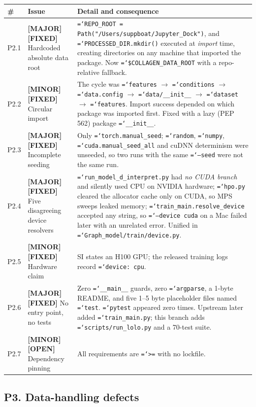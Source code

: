 \documentclass[11pt,a4paper]{article}
\newcommand{\ok}[1]{\textcolor{okgreen}{#1}}
\newcommand{\bad}[1]{\textcolor{badred}{#1}}
\newcommand{\warn}[1]{\textcolor{warnamber}{#1}}
\newcommand{\code}[1]{\texttt{\small\hyphenchar\font=`\-\relax #1}}
\newcommand{\SMAJOR}{\warn{\textbf{[MAJOR]}}}
\newcommand{\SMINOR}{\textbf{[MINOR]}}
\newcommand{\SFIXED}{\ok{\textbf{[FIXED]}}}
\newcommand{\SOPEN}{\bad{\textbf{[OPEN]}}}
\begin{document}
\begin{longtable}{@{}L{0.6cm}L{5.2cm}L{8.6cm}@{}}
\toprule
\textbf{\#} & \textbf{Issue} & \textbf{Detail and consequence} \\
\midrule
\endhead
P2.1 & \SMAJOR{} \SFIXED{} Hardcoded absolute data root &
  \code{REPO\_ROOT = Path("/Users/suppboat/Jupyter\_Dock")}, and
  \code{PROCESSED\_DIR.mkdir()} executed at \emph{import} time, creating
  directories on any machine that imported the package. Now
  \code{\$COLLAGEN\_DATA\_ROOT} with a repo-relative fallback. \\
P2.2 & \SMINOR{} \SFIXED{} Circular import &
  The cycle was \code{features} $\to$ \code{conditions} $\to$
  \code{data.config} $\to$ \code{data/\_\_init\_\_} $\to$ \code{dataset}
  $\to$ \code{features}. Import success depended on which package was
  imported first. Fixed with a
  lazy (PEP 562) package \code{\_\_init\_\_}. \\
P2.3 & \SMAJOR{} \SFIXED{} Incomplete seeding &
  Only \code{torch.manual\_seed}; \code{random}, \code{numpy},
  \code{cuda.manual\_seed\_all} and cuDNN determinism were unseeded, so two
  runs with the same \code{--seed} were not the same run. \\
P2.4 & \SMAJOR{} \SFIXED{} Five disagreeing device resolvers &
  \code{run\_model\_d\_interpret.py} had \emph{no CUDA branch} and silently
  used CPU on NVIDIA hardware; \code{hpo.py} cleared the allocator cache only
  on CUDA, so MPS sweeps leaked memory; \code{train\_main.resolve\_device}
  accepted any string, so \code{--device cuda} on a Mac failed later with an
  unrelated error. Unified in \code{Graph\_model/train/device.py}. \\
P2.5 & \SMINOR{} \SFIXED{} Hardware claim &
  SI states an H100 GPU; the released training logs record
  \code{device: cpu}. \\
P2.6 & \SMAJOR{} \SFIXED{} No entry point, no tests &
  Zero \code{\_\_main\_\_} guards, zero \code{argparse}, a 1-byte README, and
  five 1--5 byte placeholder files named \code{test}. \code{pytest} appeared
  zero times. Upstream later added \code{train\_main.py}; this branch adds
  \code{scripts/run\_lolo.py} and a 70-test suite. \\
P2.7 & \SMINOR{} \SOPEN{} Dependency pinning &
  All requirements are \code{>=} with no lockfile. \\
\bottomrule
\end{longtable}

\subsection{P3. Data-handling defects}
\end{document}
